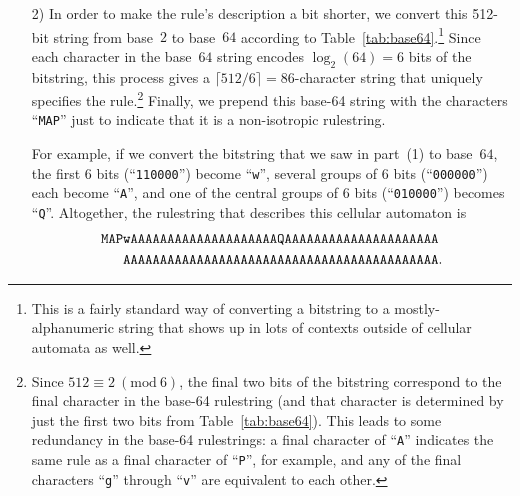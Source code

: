 \begin{itemize}
	\item[2)] In order to make the rule's description a bit shorter, we convert this 512-bit string from base~$2$ to base~$64$ according to Table~\ref{tab:base64}.\footnote{This is a fairly standard way of converting a bitstring to a mostly-alphanumeric string that shows up in lots of contexts outside of cellular automata as well.} Since each character in the base~$64$ string encodes $\log_2(64) = 6$ bits of the bitstring, this process gives a $\lceil 512/6 \rceil = 86$-character string that uniquely specifies the rule.\footnote{Since $512 \equiv 2 \ (\text{mod} \ 6)$, the final two bits of the bitstring correspond to the final character in the base-64 rulestring (and that character is determined by just the first two bits from Table~\ref{tab:base64}). This leads to some redundancy in the base-64 rulestrings: a final character of ``\texttt{A}'' indicates the same rule as a final character of ``\texttt{P}'', for example, and any of the final characters ``\texttt{g}'' through ``\texttt{v}'' are equivalent to each other.} Finally, we prepend this base-64 string with the characters ``\texttt{MAP}'' just to indicate that it is a non-isotropic rulestring.
	
	For example, if we convert the bitstring that we saw in part~(1) to base~$64$, the first 6 bits (``\texttt{110000}'') become ``\texttt{w}'', several groups of 6 bits (``\texttt{000000}'') each become ``\texttt{A}'', and one of the central groups of 6 bits (``\texttt{010000}'') becomes ``\texttt{Q}''. Altogether, the rulestring that describes this cellular automaton is
	\begin{align*}
		& \texttt{MAPwAAAAAAAAAAAAAAAAAAAAQAAAAAAAAAAAAAAAAAAAAA} \\
		& \texttt{\hphantom{MAP}AAAAAAAAAAAAAAAAAAAAAAAAAAAAAAAAAAAAAAAAAAA}.
	\end{align*}
\end{itemize}

